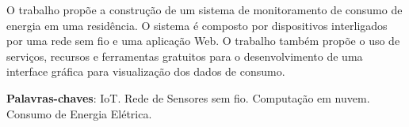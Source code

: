 \setlength{\absparsep}{18pt} %
\begin{resumo}

 O trabalho propõe a construção de um sistema de monitoramento de consumo de energia em uma residência. O sistema é composto por dispositivos interligados por uma rede sem fio e uma aplicação Web. O trabalho também propõe o uso de serviços, recursos e ferramentas gratuitos para o desenvolvimento de uma interface gráfica para visualização dos dados de consumo.

 \textbf{Palavras-chaves}: IoT. Rede de Sensores sem fio. Computação em nuvem. Consumo de Energia Elétrica.
\end{resumo}
